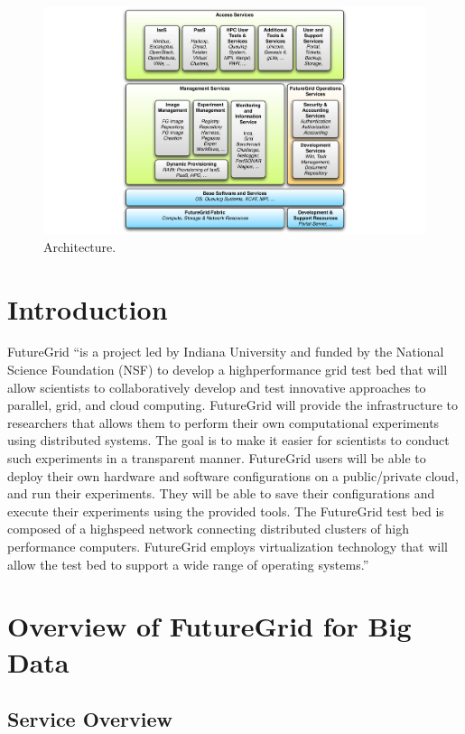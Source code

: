 \documentclass{article}
\begin{document}
\begin{figure}[h!]
  \centering
    \includegraphics[width=1.0\textwidth]{images/architecture.pdf}
  \caption{Architecture.}
\end{figure}

\section{Introduction}

FutureGrid \cite{las2010gce,las12fg-bookchapter}“is a project led by Indiana University and funded by the National Science Foundation (NSF) to develop a highperformance grid test bed that will allow scientists to collaboratively develop and test innovative approaches to parallel, grid, and cloud computing. FutureGrid will provide the infrastructure to researchers that allows them to perform their own computational experiments using distributed systems. The goal is to make it easier for scientists to conduct such experiments in a transparent manner.  FutureGrid users will be able to deploy their own hardware and software configurations on a public/private cloud, and run their experiments. They will be able to save their configurations and execute their experiments using the provided tools. The FutureGrid test bed is composed of a highspeed network connecting distributed clusters of high performance computers. FutureGrid employs virtualization technology that will allow the test bed to support a wide range of operating systems.”


\section{Overview of FutureGrid for Big Data}

\subsection{Service Overview}
\end{document}
